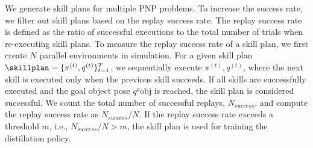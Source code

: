 We generate skill plans for multiple PNP problems. To increase the success rate, we filter out skill plans based on the replay success rate. The replay success rate is defined as the ratio of successful executions to the total number of trials when re-executing skill plans. To measure the replay success rate of a skill plan, we first create $N$ parallel environments in simulation. For a given skill plan $\skillplan = \{\pi^{(t)},q^{(t)}\}_{t=1}^{T}$, we sequentially execute $\pi^{(t)},q^{(t)}$, where the next skill is executed only when the previous skill succeeds. If all skills are successfully executed and the goal object pose $q^g{\text{obj}}$ is reached, the skill plan is considered successful. We count the total number of successful replays, $N_{success}$, and compute the replay success rate as $N_{success}/N$. If the replay success rate exceeds a threshold $m$, i.e., $N_{success}/N > m$, the skill plan is used for training the distillation policy. 